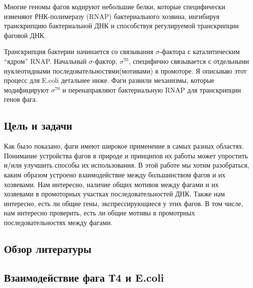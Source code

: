 \documentclass[14pt]{extarticle}
\begin{document}
    \par{Многие геномы фагов кодируют небольшие белки, которые специфически изменяют РНК-полимеразу (RNAP)
    бактериального хозяина, ингибируя транскрипцию бактериальной ДНК и способствуя регулируемой транскрипции фаговой 
    ДНК. \cite{phagetrans}}    
    
    \par{Транскрипция бактерии начинается со связывания $\sigma$-фактора с каталитическим ``ядром'' RNAP. Начальный 
    $\sigma$-фактор, $\sigma^{70}$, специфично связывается с отдельными нуклеотидными последовательностями(мотивами) в 
    промоторе. Я описываю этот процесс для E.coli детальнее ниже. Фаги развили механизмы, которые модифицируют 
    $\sigma^{70}$ и перенаправляют бактериальную RNAP для транскрипции генов фага.}
    
\newpage
\begin{center}
\item \section{Цель и задачи} \label{sec:code}
\end{center}

    \par{Как было показано, фаги имеют широкое применение в самых разных областях. Понимание устройства фагов в природе 
    и принципов их работы может упростить и/или улучшить способы их использования. В этой работе мы хотим разобраться, 
    каким образом устроено взаимодействие между большинством фагов и их хозяевами. Нам интересно, наличие общих мотивов 
    между фагами и их хозяевами в промоторных участках последовательностей ДНК. Также нам интересно, есть ли общие гены,
    экспрессирующиеся у этих фагов. В том числе, нам интересно проверить, есть ли общие мотивы в промотрных 
    последовательностях между фагами.}

\newpage
\begin{center}
\item \section{Обзор литературы} \label{sec:math}
\item \subsection{Взаимодействие фага Т4 и E.coli}
\end{center}
        
\end{document}
